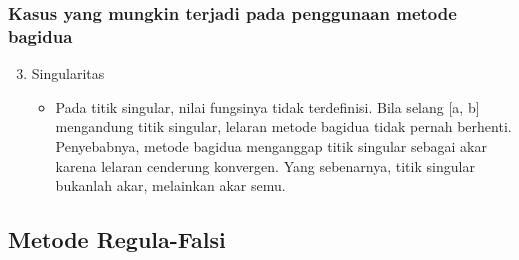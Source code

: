 \documentclass[pdflatex,compress]{beamer}
\begin{document}
\begin{frame}
	\frametitle{Kasus yang mungkin terjadi pada penggunaan metode bagidua}
	\begin{enumerate}
		\setcounter{enumi}{2}
		\item Singularitas
		\begin{itemize}
			\item Pada titik singular, nilai fungsinya tidak terdefinisi. Bila selang [a, b] mengandung titik singular, lelaran metode bagidua tidak pernah berhenti. Penyebabnya, metode bagidua menganggap titik singular sebagai akar karena lelaran cenderung konvergen. Yang sebenarnya, titik singular bukanlah akar, melainkan akar semu.
		\end{itemize}
	\end{enumerate}
\end{frame}

\subsection{Metode Regula-Falsi}
\end{document}
